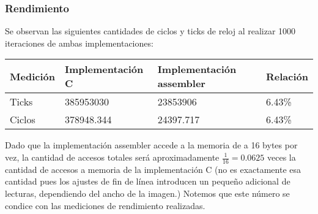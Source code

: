\subsubsection{Rendimiento}

Se observan las siguientes cantidades de ciclos y ticks de reloj al realizar 1000 iteraciones de ambas implementaciones:

\begin{center}
    \begin{tabular}{|l|l|l|l|}
        \hline
        Medición & Implementación C & Implementación assembler & Relación \\
        \hline
        Ticks    & 385953030        & 23853906           & 6.43\% \\
        Ciclos   & 378948.344       & 24397.717          & 6.43\% \\
        \hline
    \end{tabular}
\end{center}

Dado que la implementación assembler accede a la memoria de a 16 bytes por vez, la cantidad de accesos totales será
aproximadamente $\frac{1}{16} = 0.0625$ veces la cantidad de accesos a memoria de la implementación C
(no es exactamente esa cantidad pues los ajustes de fin de línea introducen un pequeño adicional de lecturas,
dependiendo del ancho de la imagen.) Notemos que este número se condice con las mediciones de rendimiento realizadas.